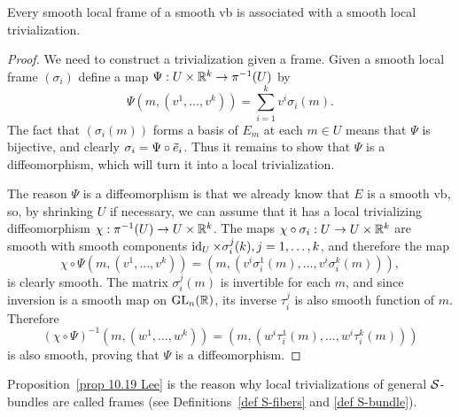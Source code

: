\begin{prop}\label{prop 10.19 Lee}
    Every smooth local frame of a smooth \gls{vb} is associated with a smooth local trivialization.
\end{prop}
\begin{proof}
    We need to construct a trivialization given a frame. Given a smooth local frame $(\sigma_i)$ define a map $\Psi:U\times\mathbb{R}^k\to \pi^{-1}(U)$ by
    \[\Psi(m,(v^1,\ldots,v^k))=\sum_{i=1}^k v^i\sigma_i(m).\]
    The fact that $(\sigma_i(m))$ forms a basis of $E_m$ at each $m\in U$ means that $\Psi$ is bijective, and clearly $\sigma_i=\Psi\circ \wt{e}_i$.  Thus it remains to show that $\Psi$ is a diffeomorphism, which will turn it into a local trivialization.

    The reason $\Psi$ is a diffeomorphism is that we already know that $E$ is a smooth \gls{vb}, so, by shrinking $U$ if necessary, we can assume that it has a local trivializing diffeomorphism $\chi:\pi^{-1}(U)\to U\times\mathbb{R}^k$. The maps $\chi\circ \sigma_i:U\to U\times\mathbb{R}^k$ are smooth with smooth components $\operatorname{id}_U\times \sigma^j_i(k),j=1,\ldots,k$, and therefore the map
    \[\chi\circ\Psi(m,(v^1,\ldots,v^k))=(m,(v^i\sigma^1_i(m),\ldots,v^i\sigma^k_i(m))),\]
    is clearly smooth. The matrix $\sigma_i^j(m)$ is invertible for each $m$, and since inversion is a smooth map on $\operatorname{GL}_n(\mathbb{R})$, its inverse $\tau_i^j$ is also smooth function of $m$. Therefore
    \[(\chi\circ\Psi)^{-1}(m,(w^1,\ldots,w^k))=(m,(w^i\tau_i^1(m),\ldots,w^i\tau_i^k(m)))\]
    is also smooth, proving that $\Psi$ is a diffeomorphism.
\end{proof}

\begin{rem}
    Proposition~\ref{prop 10.19 Lee} is the reason why local trivializations of general $\mathcal{S}$-bundles are called frames (see Definitions~\ref{def S-fibers} and \ref{def S-bundle}).
\end{rem}

